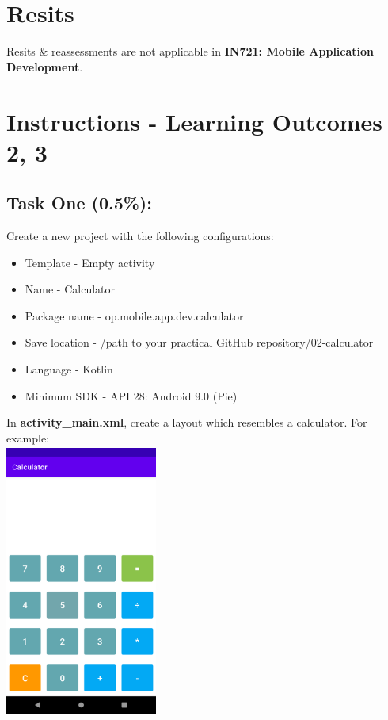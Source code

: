 \documentclass{article}
\begin{document}
\section*{Resits}
Resits \& reassessments are not applicable in \textbf{IN721: Mobile Application Development}.

\section*{Instructions - Learning Outcomes 2, 3}

\subsection*{Task One (0.5\%):} 

Create a new project with the following configurations:
\begin{itemize}
	\item Template - Empty activity
	\item Name - Calculator
	\item Package name - op.mobile.app.dev.calculator
	\item Save location - /path to your practical GitHub repository/02-calculator
	\item Language - Kotlin
	\item Minimum SDK - API 28: Android 9.0 (Pie) 
\end{itemize} 

In \textbf{activity\_main.xml}, create a layout which resembles a calculator. For example: \\

\includegraphics[width=5cm, height=9cm]{../tex/img/practicals/02-calculator-1.png}  \\
\end{document}
